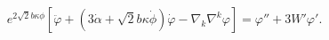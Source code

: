 \begin{equation}
e^{2 \sqrt{2} b \kappa \phi} \left[ \ddot{\varphi} 
+ (3 \dot{\alpha} + \sqrt{2} b \kappa \dot{\phi}) \dot{\varphi}
- \nabla_{k}\nabla^{k} \varphi\right]
= \varphi'' +  3 W' \varphi'.
\end{equation}

